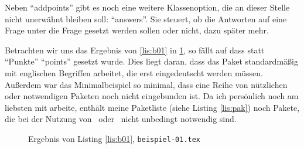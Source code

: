 Neben \enquote{addpoints} gibt es noch eine weitere Klassenoption, die an dieser Stelle nicht unerwähnt bleiben soll: \enquote{answers}. Sie steuert, ob die Antworten auf eine Frage unter die Frage gesetzt werden sollen oder nicht, dazu später mehr.

Betrachten wir uns das Ergebnis von \ref{lis:b01} in \cref{fig:b01}, so fällt auf dass statt \enquote{Punkte} \enquote{points} gesetzt wurde. 
Dies liegt daran, dass das Paket standardmäßig mit englischen Begriffen arbeitet, die erst eingedeutscht werden müssen. Außerdem war das Minimalbeispiel so minimal, dass eine Reihe von nützlichen oder notwendigen Paketen noch nicht eingebunden ist. 
Da ich persönlich noch am liebsten mit  arbeite, enthält meine Paketliste (siehe Listing \ref{lis:pak}) noch Pakete, die bei der Nutzung von \XeLaTeX\ oder \LuaLaTeX\ nicht unbedingt notwendig sind.

\begin{figure}
\caption{Ergebnis von Listing \ref{lis:b01}, \texttt{beispiel-01.tex}}\label{fig:b01}
\end{figure}



